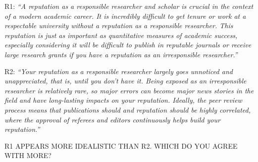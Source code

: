 \documentclass[portrait,11pt]{seminar}
\begin{document}









R1: {\it ``A reputation as a responsible researcher and scholar is crucial in the context of a modern academic career. It is incredibly difficult to get tenure or work at a respectable university without a reputation as a responsible researcher. This reputation is just as important as quantitative measures of academic success, especially considering it will be difficult to publish in reputable journals or receive large research grants if you have a reputation as an irresponsible researcher.''}

\es

\bs

R2: {\it ``Your reputation as a responsible researcher largely goes unnoticed and unappreciated, that is, until you don’t have it. Being exposed as an irresponsible researcher is relatively rare, so major errors can become major news stories in the field and have long-lasting impacts on your reputation. Ideally, the peer review process means that publications should and reputation should be highly correlated, where the approval of referees and editors continuously helps build your reputation.''}

\medskip

R1 APPEARS MORE IDEALISTIC THAN R2. WHICH DO YOU AGREE WITH MORE?





\es
\end{document}

